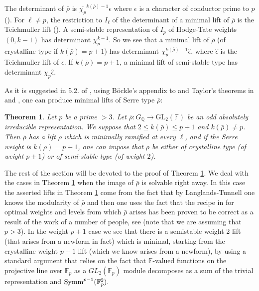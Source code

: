 \documentclass[12pt]{article}
\newcommand{\Q}{\mathbb{Q}}
\newcommand{\rhobar}{\overline{\rho}}
\newtheorem{theorem}{Theorem}[section]
\def\rhobar{ {\bar {\rho} } }
\def\rhob{ {\bar {\rho} } }
\newcommand{\F}{{\mathbb F}}
\begin{document}
The determinant of ${\rhob}$ is
$\overline{\chi_p}^{k(\rhob )-1}
\epsilon$ where $\epsilon$ is a character of conductor prime to $p$
(\cite{Serre3}). For $\ell\not=p$, the restriction to $I_{\ell}$
of the determinant of a minimal lift of $\rhob$ is the Teichmuller
lift (\cite{[D97]}). A semi-stable representation of $I_p$
of Hodge-Tate weights $(0,k-1)$ has determinant $\chi_p ^{k-1}$.
So we see that a minimal lift of $\rhob$ (of crystalline type
if $k(\rhob )=p+1$) has determinant
$\chi_p ^{k(\rhob )-1} \widehat{\epsilon}$, where
$\widehat{\epsilon}$ is the Teichmuller lift of $\epsilon$.
If $k(\rhob )=p+1$, a minimal lift of semi-stable type has determinant
$\chi_p  \widehat{\epsilon}$.

As it is suggested in 5.2. of \cite{[KR03]},
using B\"ockle's appendix to \cite{[K03]} and
Taylor's theorems in \cite{[T03]} and \cite{[T02]},
one can produce minimal lifts of Serre type $\rhob$:


\begin{theorem}\label{existminimallift}
Let $p$ be a prime $> 3$.
Let
$\overline{\rho} : G_{\Q}\rightarrow
\mathrm{GL}_2 (\F)$ be an odd absolutely irreducible representation.
We suppose that $2 \leq k(\rhob) \leq p+1$ and 
 $k(\rhob)\not= p$. Then
$\rhob$ has  a lift $\rho$ which is minimally ramified
at every $\ell$, and if the Serre weight is
$k(\overline{\rho} )=p+1$,  one can impose
that $\rho$ be either of crystalline type (of weight $p+1$)
or of semi-stable type (of weight $2$).
\end{theorem}

The rest of the section will be devoted to the proof of Theorem
\ref{existminimallift}. We deal with the cases in Theorem
\ref{existminimallift} when  the image of $\rhob$ is
solvable right away. In this case the asserted lifts in Theorem
\ref{existminimallift} come from the fact that by Langlands-Tunnell one
knows the modularity of $\rhobar$ and then one uses the fact that the
recipe in \cite{Serre3}
for optimal weights and levels from which $\rhob$ arises  has been proven to
be correct
as a result of the work of a number of people, see \cite{Ribet1}
(note that we are
assuming that $p>3$). In the weight $p+1$ case we see that there is a
semistable weight 2 lift (that arises from a newform in fact)
which is minimal,
starting from the crystalline weight $p+1$ lift (which we know arises
from
a newform),
by using a standard argument
that relies on the fact that $\F$-valued functions on the  projective
line
over $\F_p$ as a $GL_2(\F_p)$ module decomposes as a sum of the
trivial representation and ${\rm Symm}^{p-1}(\F_p^2)$.
\end{document}
